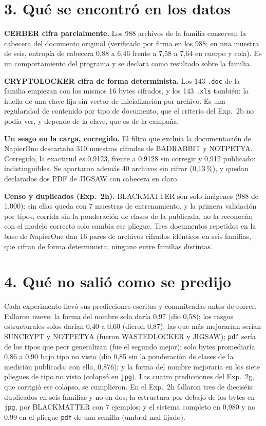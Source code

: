 \documentclass[11pt,a4paper]{article}
\begin{document}
\section*{3. Qué se encontró en los datos}

\textbf{CERBER cifra parcialmente.} Los 988 archivos de la familia conservan la cabecera del
documento original (verificado por firma en los 988; en una muestra de seis, entropía de cabecera
0,88 a 6,46 frente a 7,58 a 7,64 en cuerpo y cola). Es un comportamiento del programa y se
declara como resultado sobre la familia.

\textbf{CRYPTOLOCKER cifra de forma determinista.} Los 143 \texttt{.doc} de la familia empiezan
con los mismos 16 bytes cifrados, y los 143 \texttt{.xls} también: la huella de una clave fija sin
vector de inicialización por archivo. Es una regularidad de contenido por tipo de documento, que el
criterio del Exp.~2b no podía ver, y depende de la clave, que es de la campaña.

\textbf{Un sesgo en la carga, corregido.} El filtro que excluía la documentación de NapierOne
descartaba 310 muestras cifradas de BADRABBIT y NOTPETYA. Corregido, la exactitud es 0,9123,
frente a 0,9128 sin corregir y 0,912 publicado: indistinguibles. Se apartaron además 40 archivos
sin cifrar (0,13\,\%), y quedan declarados dos PDF de JIGSAW con cabecera en claro.

\textbf{Censo y duplicados (Exp.\ 2h).} BLACKMATTER son solo imágenes (988 de 1.000): sin ellas
queda con 7 muestras de entrenamiento, y la primera validación por tipos, corrida sin la ponderación
de clases de la publicada, no la reconocía; con el modelo correcto solo cambia ese pliegue. Tres
documentos repetidos en la base de NapierOne dan 16 pares de archivos cifrados idénticos en seis
familias, que cifran de forma determinista; ninguno entre familias distintas.

\section*{4. Qué no salió como se predijo}

Cada experimento llevó sus predicciones escritas y commiteadas antes de correr. Fallaron nueve:
la forma del nombre sola daría 0,97 (dio 0,58); los rasgos estructurales solos darían 0,40 a
0,60 (dieron 0,87); las que más mejorarían serían SUNCRYPT y NOTPETYA (fueron WASTEDLOCKER y
JIGSAW); \texttt{pdf} sería de los tipos que peor generalizan (fue el segundo mejor); solo bytes
promediaría 0,86 a 0,90 bajo tipo no visto (dio 0,85 sin la ponderación de clases de la medición publicada; con ella, 0,876); y la forma del
nombre mejoraría en los siete pliegues de tipo no visto (colapsó en \texttt{jpg}). Las cuatro
predicciones del Exp.~2g, que corrigió ese colapso, se cumplieron. En el Exp.~2h fallaron tres de
dieciséis: duplicados en seis familias y no en dos; la estructura por debajo de los bytes en
\texttt{jpg}, por BLACKMATTER con 7 ejemplos; y el sistema completo en 0,980 y no 0,99 en el pliegue
\texttt{pdf} de una semilla (umbral mal fijado).
\end{document}
